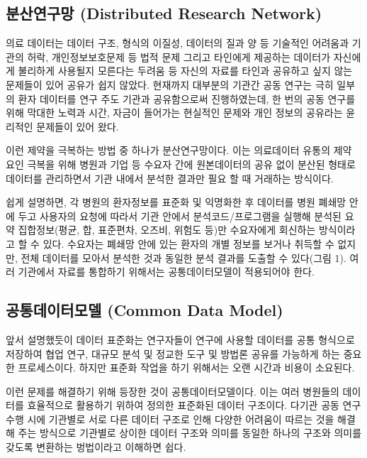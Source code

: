 \documentclass[]{book}
\begin{document}
\hypertarget{distributed-research-network}{%
\subsection{분산연구망 (Distributed Research Network)}\label{distributed-research-network}}

의료 데이터는 데이터 구조, 형식의 이질성, 데이터의 질과 양 등 기술적인 어려움과 기관의 허락, 개인정보보호문제 등 법적 문제 그리고 타인에게 제공하는 데이터가 자신에게 불리하게 사용될지 모른다는 두려움 등 자신의 자료를 타인과 공유하고 싶지 않는 문제들이 있어 공유가 쉽지 않았다. 현재까지 대부분의 기관간 공동 연구는 극히 일부의 환자 데이터를 연구 주도 기관과 공유함으로써 진행하였는데, 한 번의 공동 연구를 위해 막대한 노력과 시간, 자금이 들어가는 현실적인 문제와 개인 정보의 공유라는 윤리적인 문제들이 있어 왔다.

이런 제약을 극복하는 방법 중 하나가 분산연구망이다. 이는 의료데이터 유통의 제약 요인 극복을 위해 병원과 기업 등 수요자 간에 원본데이터의 공유 없이 분산된 형태로 데이터를 관리하면서 기관 내에서 분석한 결과만 필요 할 때 거래하는 방식이다.

쉽게 설명하면, 각 병원의 환자정보를 표준화 및 익명화한 후 데이터를 병원 폐쇄망 안에 두고 사용자의 요청에 따라서 기관 안에서 분석코드/프로그램을 실행해 분석된 요약 집합정보(평균, 합, 표준편차, 오즈비, 위험도 등)만 수요자에게 회신하는 방식이라고 할 수 있다. 수요자는 폐쇄망 안에 있는 환자의 개별 정보를 보거나 취득할 수 없지만, 전체 데이터를 모아서 분석한 것과 동일한 분석 결과를 도출할 수 있다(그림 1). 여러 기관에서 자료를 통합하기 위해서는 공통데이터모델이 적용되어야 한다.

\hypertarget{common-data-model}{%
\subsection{공통데이터모델 (Common Data Model)}\label{common-data-model}}

앞서 설명했듯이 데이터 표준화는 연구자들이 연구에 사용할 데이터를 공통 형식으로 저장하여 협업 연구, 대규모 분석 및 정교한 도구 및 방법론 공유를 가능하게 하는 중요한 프로세스이다. 하지만 표준화 작업을 하기 위해서는 오랜 시간과 비용이 소요된다.

이런 문제를 해결하기 위해 등장한 것이 공통데이터모델이다. 이는 여러 병원들의 데이터를 효율적으로 활용하기 위하여 정의한 표준화된 데이터 구조이다. 다기관 공동 연구 수행 시에 기관별로 서로 다른 데이터 구조로 인해 다양한 어려움이 따르는 것을 해결해 주는 방식으로 기관별로 상이한 데이터 구조와 의미를 동일한 하나의 구조와 의미를 갖도록 변환하는 벙법이라고 이해하면 쉽다.
\end{document}
